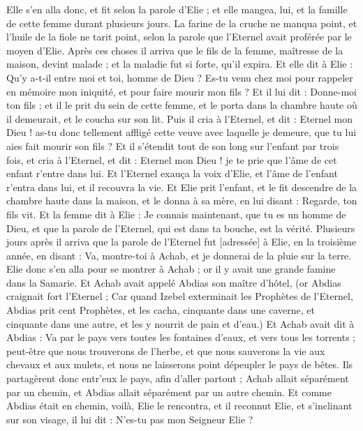 \begin{multicols}{2}
Elle s'en alla donc, et fit selon la parole d'Elie ; et elle mangea, lui, et la famille de cette femme durant plusieurs jours.
La farine de la cruche ne manqua point, et l'huile de la fiole ne tarit point, selon la parole que l'Eternel avait proférée par le moyen d'Elie.
Après ces choses il arriva que le fils de la femme, maîtresse de la maison, devint malade ; et la maladie fut si forte, qu'il expira.
Et elle dit à Elie : Qu'y a-t-il entre moi et toi, homme de Dieu ? Es-tu venu chez moi pour rappeler en mémoire mon iniquité, et pour faire mourir mon fils ?
Et il lui dit : Donne-moi ton fils ; et il le prit du sein de cette femme, et le porta dans la chambre haute où il demeurait, et le coucha sur son lit.
Puis il cria à l'Eternel, et dit : Eternel mon Dieu ! as-tu donc tellement affligé cette veuve avec laquelle je demeure, que tu lui aies fait mourir son fils ?
Et il s'étendit tout de son long sur l'enfant par trois fois, et cria à l'Eternel, et dit : Eternel mon Dieu ! je te prie que l'âme de cet enfant r'entre dans lui.
Et l'Eternel exauça la voix d'Elie, et l'âme de l'enfant r'entra dans lui, et il recouvra la vie.
Et Elie prit l'enfant, et le fit descendre de la chambre haute dans la maison, et le donna à sa mère, en lui disant : Regarde, ton fils vit.
Et la femme dit à Elie : Je connais maintenant, que tu es un homme de Dieu, et que la parole de l'Eternel, qui est dans ta bouche, est la vérité.
\VerseOne{}Plusieurs jours après il arriva que la parole de l'Eternel fut [adressée] à Elie, en la troisième année, en disant : Va, montre-toi à Achab, et je donnerai de la pluie sur la terre.
Elie donc s'en alla pour se montrer à Achab ; or il y avait une grande famine dans la Samarie.
Et Achab avait appelé Abdias son maître d'hôtel, (or Abdias craignait fort l'Eternel ;
Car quand Izebel exterminait les Prophètes de l'Eternel, Abdias prit cent Prophètes, et les cacha, cinquante dans une caverne, et cinquante dans une autre, et les y nourrit de pain et d'eau.)
Et Achab avait dit à Abdias : Va par le pays vers toutes les fontaines d'eaux, et vers tous les torrents ; peut-être que nous trouverons de l'herbe, et que nous sauverons la vie aux chevaux et aux mulets, et nous ne laisserons point dépeupler le pays de bêtes.
Ils partagèrent donc entr'eux le pays, afin d'aller partout ; Achab allait séparément par un chemin, et Abdias allait séparément par un autre chemin.
Et comme Abdias était en chemin, voilà, Elie le rencontra, et il reconnut Elie, et s'inclinant sur son visage, il lui dit : N'es-tu pas mon Seigneur Elie ?

\end{multicols}
